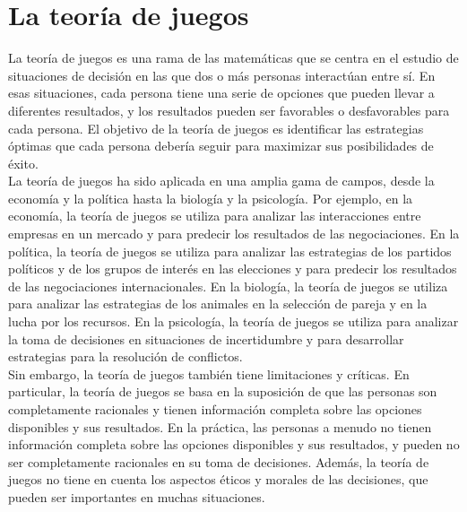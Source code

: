 \section{La teoría de juegos}


La teoría de juegos es una rama de las matemáticas que se centra en el estudio de situaciones 
de decisión en las que dos o más personas interactúan entre sí. En esas situaciones, 
cada persona tiene una serie de opciones que pueden llevar a diferentes resultados, y los resultados 
pueden ser favorables o desfavorables para cada persona. 
El objetivo de la teoría de juegos es identificar las estrategias óptimas que 
cada persona debería seguir para maximizar sus posibilidades de éxito.\\

La teoría de juegos ha sido aplicada en una amplia gama de campos, desde la economía y 
la política hasta la biología y la psicología. Por ejemplo, en la economía, la teoría de juegos 
se utiliza para analizar las interacciones entre empresas en un mercado y para predecir los 
resultados de las negociaciones. En la política, la teoría de juegos se utiliza para analizar 
las estrategias de los partidos políticos y de los grupos de interés en las elecciones y 
para predecir los resultados de las negociaciones internacionales. En la biología, 
la teoría de juegos se utiliza para analizar las estrategias de los animales en la selección 
de pareja y en la lucha por los recursos. En la psicología, la teoría de juegos se utiliza para 
analizar la toma de decisiones en situaciones de incertidumbre y para desarrollar estrategias 
para la resolución de conflictos.\\

Sin embargo, la teoría de juegos también tiene limitaciones y críticas. En particular, 
la teoría de juegos se basa en la suposición de que las personas son completamente racionales y 
tienen información completa sobre las opciones disponibles y sus resultados. En la práctica, 
las personas a menudo no tienen información completa sobre las opciones disponibles y sus resultados, 
y pueden no ser completamente racionales en su toma de decisiones. Además, la teoría de juegos 
no tiene en cuenta los aspectos éticos y morales de las decisiones, que pueden ser importantes en 
muchas situaciones.
